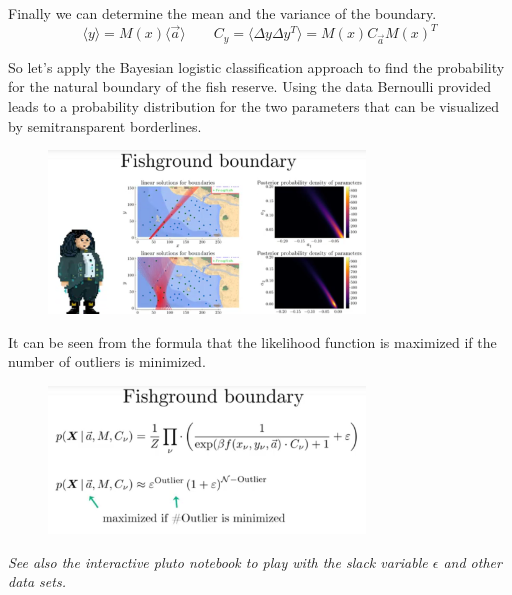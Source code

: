 \documentclass[12pt, a4paper]{scrartcl}
\begin{document}
Finally we can determine the mean and the variance of the boundary. 
\[\langle y\rangle =M(x)\langle \vec{a}\rangle \qquad C_y=\langle \Delta y \Delta y^T\rangle = M(x)C_{\vec{a}}M(x)^T\]

So let’s apply the Bayesian logistic classification approach to find the probability for the natural
boundary of the fish reserve. Using the data Bernoulli provided leads
to a probability distribution for the two parameters that can be visualized
by semitransparent borderlines.%
\begin{figure}[H]
	\centering
	\includegraphics[width=0.75\textwidth]{7_16.png}
\end{figure}
 It can be seen from the formula that the likelihood function is maximized if the number of outliers is minimized. \\%
 \begin{figure}[H]
 	\centering
	\includegraphics[width=0.75\textwidth]{7_17.png}
\end{figure}

\textit{See also the interactive pluto notebook to play with the slack variable $\epsilon$ and
other data sets.}\\
\end{document}
